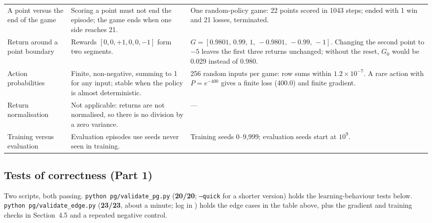 \documentclass[10pt,a4paper]{article}
\newcommand{\code}[1]{\texttt{#1}}
\newcommand{\pass}[1]{\textcolor{green!50!black}{\textbf{#1}}}
\newcommand{\sci}[2]{$#1\times10^{#2}$}
\begin{document}
\begin{longtable}{@{}p{3.4cm}p{6.3cm}p{6.9cm}@{}}
A point versus the end of the game & Scoring a point must not end the episode; the game ends when one side reaches 21. & One random-policy game: 22 points scored in 1043 steps; ended with 1 win and 21 losses, terminated. \\
Return around a point boundary & Rewards $[0,0,+1,0,0,-1]$ form two segments. & $G=[0.9801,\,0.99,\,1,\,-0.9801,\,-0.99,\,-1]$. Changing the second point to $-5$ leaves the first three returns unchanged; without the reset, $G_0$ would be 0.029 instead of 0.980. \\
Action probabilities & Finite, non-negative, summing to 1 for any input; stable when the policy is almost deterministic. & 256 random inputs per game: row sums within \sci{1.2}{-7}. A rare action with $P=e^{-400}$ gives a finite loss (400.0) and finite gradient. \\
Return normalisation & Not applicable: returns are not normalised, so there is no division by a zero variance. & --- \\
Training versus evaluation & Evaluation episodes use seeds never seen in training. & Training seeds 0--9,999; evaluation seeds start at $10^9$. \\
\hline
\end{longtable}

\subsection{Tests of correctness (Part 1)}
Two scripts, both passing. \code{python pg/validate\_pg.py} (\pass{20/20}; \code{--quick} for a shorter version) holds the
learning-behaviour tests below. \code{python pg/validate\_edge.py} (\pass{23/23}, about a minute; log in
) holds the edge cases in the table above, plus the gradient and training checks in
Section~4.5 and a repeated negative control.
\end{document}
